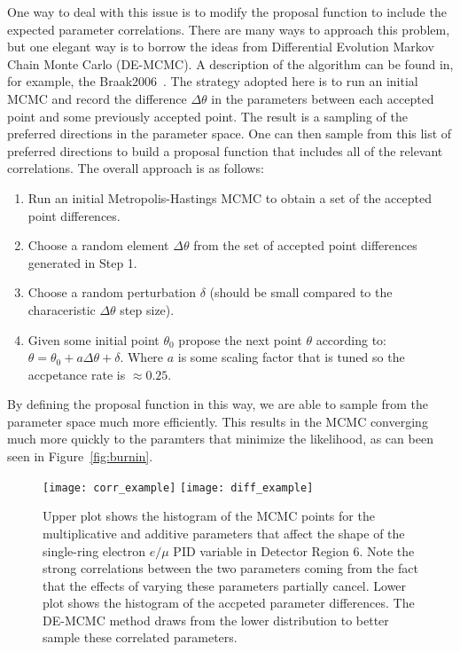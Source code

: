{One way to deal with this issue is to modify the proposal function to include
the expected parameter correlations.  There are many ways to approach this
problem, but one elegant way is to borrow the ideas from Differential Evolution
Markov Chain Monte Carlo (DE-MCMC).  A description of the algorithm can be
found in, for example, the Braak2006~\cite{Braak2006}. The strategy adopted
here is to run an initial MCMC and record the difference $\Delta \theta$ in the
parameters between each accepted point and some previously accepted point. The
result is a sampling of the preferred directions in the parameter space. One
can then sample from this list of preferred directions to build a proposal
function that includes all of the relevant correlations.  The overall approach
is as follows:
%
\begin{enumerate}
  \item Run an initial Metropolis-Hastings MCMC to obtain a set of the
    accepted point differences.  
  \item Choose a random element $\Delta \theta$ from the set of accepted point
    differences generated in Step 1.
  \item Choose a random perturbation $\delta$ (should be small compared to the characeristic
    $\Delta \theta$ step size).
  \item Given some initial point $\theta_{0}$ propose the next point $\theta$
    according to: $\theta = \theta_{0} + a \Delta \theta + \delta$. Where $a$ is some scaling factor that is
    tuned so the accpetance rate is $\approx 0.25$.
\end{enumerate}
%
By defining the proposal function in this way, we are able to sample from the
parameter space much more efficiently. This results in the MCMC converging much
more quickly to the paramters that minimize the likelihood, as can been seen in
Figure~\ref{fig:burnin}.


\begin{figure}[h]
  \begin{center}
    \texttt{[image: corr\_example]}
    \texttt{[image: diff\_example]}
  \end{center}
  \caption{Upper plot shows the histogram of the MCMC points for the
  multiplicative and additive parameters that affect the shape of the
  single-ring electron $e/\mu$ PID variable in Detector Region 6.  Note
  the strong correlations between the two parameters coming from the fact that
  the effects of varying these parameters partially cancel.  Lower plot shows
  the histogram of the accpeted parameter differences.  The DE-MCMC method
  draws from the lower distribution to better sample these correlated parameters.}
  \label{fig:parcor}
\end{figure}


}
